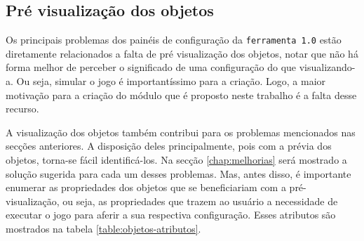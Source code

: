 \documentclass[12pt,twoside,openright,a4paper,english,brazil,sumario=tradicional]{abntex2}
\begin{document}
\subsection{Pré visualização dos objetos}
\label{sec:previa-objetos}
Os principais problemas dos painéis de configuração da \texttt{ferramenta 1.0} estão diretamente relacionados a falta de pré visualização dos objetos, notar que não há forma melhor de perceber o significado de uma configuração do que visualizando-a. Ou seja, simular o jogo é importantíssimo para a criação. Logo, a maior motivação para a criação do módulo que é proposto neste trabalho é a falta desse recurso.

A visualização dos objetos também contribui para os problemas mencionados nas secções anteriores. A disposição deles principalmente, pois com a prévia dos objetos, torna-se fácil identificá-los. Na secção \ref{chap:melhorias} será mostrado a solução sugerida para cada um desses problemas. Mas, antes disso, é importante enumerar as propriedades dos objetos que se beneficiariam com a pré-visualização, ou seja, as propriedades que trazem ao usuário a necessidade de executar o jogo para aferir a sua respectiva configuração. Esses atributos são mostrados na tabela \ref{table:objetos-atributos}.
\end{document}
